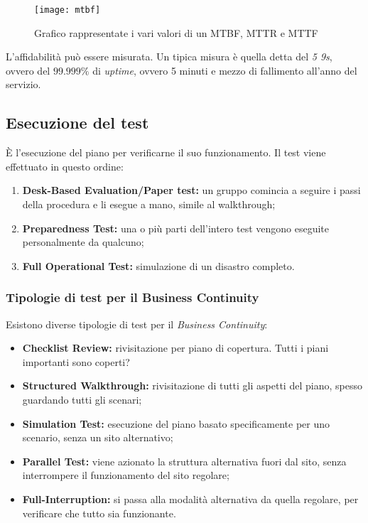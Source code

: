 \begin{figure}[H]
 \centering
 \texttt{[image: mtbf]}
 \caption{Grafico rappresentate i vari valori di un MTBF, MTTR e MTTF}
\end{figure}


L'affidabilità può essere misurata. Un tipica misura è quella detta del
\textit{5 9s}, ovvero del $99.999\%$ di \textit{uptime}, ovvero 5 minuti e
mezzo di fallimento all'anno del servizio.

\subsection{Esecuzione del test}

È l'esecuzione del piano per verificarne il suo funzionamento.
Il test viene effettuato in questo ordine:
\begin{enumerate}
  \item \textbf{Desk-Based Evaluation/Paper test:} un gruppo comincia a seguire i passi della procedura e li esegue a mano,
simile al walkthrough;
  \item \textbf{Preparedness Test:} una o più parti dell'intero test vengono eseguite personalmente da qualcuno;
  \item \textbf{Full Operational Test:} simulazione di un disastro completo.
\end{enumerate}

\subsubsection{Tipologie di test per il Business Continuity}

Esistono diverse tipologie di test per il \textit{Business Continuity}:
\begin{itemize}
  \item \textbf{Checklist Review:} rivisitazione per piano di copertura. Tutti i piani importanti sono coperti?
  \item \textbf{Structured Walkthrough:} rivisitazione di tutti gli aspetti del piano, spesso guardando tutti gli
  scenari;
  \item \textbf{Simulation Test:} esecuzione del piano basato specificamente per uno scenario, senza un sito
  alternativo;
  \item \textbf{Parallel Test:} viene azionato la struttura alternativa fuori dal sito, senza
  interrompere il funzionamento del sito regolare;
  \item \textbf{Full-Interruption:} si passa alla modalità alternativa da quella regolare, per verificare che
  tutto sia funzionante.
\end{itemize}

